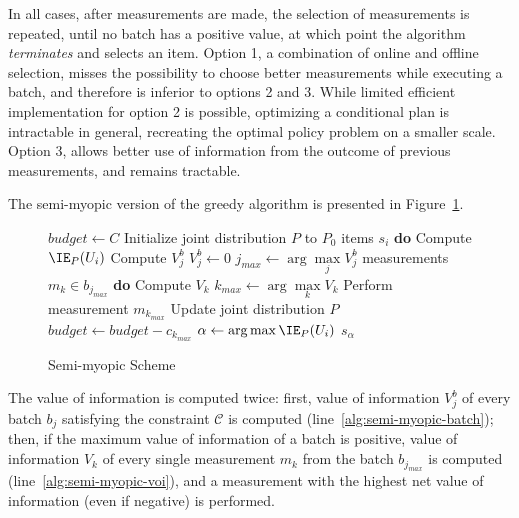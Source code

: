 In all cases, after measurements are made, the selection of measurements is repeated,
until no batch has a positive value, at which point the algorithm {\em
  terminates} and selects an item. Option 1, a combination of online
and offline selection, misses the possibility to choose better
measurements while executing a batch, and therefore is inferior to
options 2 and 3. While limited efficient implementation for option 2 is
possible, optimizing a conditional plan is intractable in general,
recreating the optimal policy problem on a smaller scale.  
Option 3, allows better use of information from
the outcome of previous measurements, and remains tractable.


The semi-myopic version of the greedy algorithm is presented in
Figure~\ref{alg:semi-myopic-scheme}. 
\begin{figure}
\begin{algorithmic}[1]
\STATE $budget \leftarrow C$
\STATE Initialize joint distribution $P$ to $P_0$ \label{alg:semi-myopic-initialize-beliefs}
\LOOP                        \label{alg:semi-myopic-main-loop-start}
   items $s_i$ {\bf do} Compute $\IE_P(U_i)$ \label{alg:semi-myopic-compute-eu}
    \label{alg:semi-myopic-select-start}\label{alg:semi-myopic-compute-batch-start}
      \STATE Compute $V_j^b$
    \ELSE
      \STATE $V_j^b \leftarrow 0$ \label{alg:semi-myopic-batch}
    \ENDIF
  \ENDFOR                         \label{alg:semi-myopic-compute-batch-end}
  \STATE $j_{max} \leftarrow \arg \max\limits_j V_j^b$
     {measurements $m_k \in b_{j_{max}}$} {\bf do} Compute $V_k$  \label{alg:semi-myopic-voi}
    \STATE $k_{max} \leftarrow \arg \max\limits_k V_k$
    \STATE Perform measurement $m_{k_{max}}$ \label{alg:semi-myopic-measure}
    \STATE Update joint distribution $P$ \label{alg:semi-myopic-update-beliefs}
    \STATE $budget \leftarrow budget-c_{k_{max}}$  \label{alg:semi-myopic-select-end}
  \ENDIF
   \label{alg:semi-myopic-break}
\ENDLOOP                \label{alg:semi-myopic-main-loop-end}
\STATE $\alpha \leftarrow \arg \max \IE_P(U_i)$ \label{alg:semi-myopic-return-alpha}
\RETURN $s_\alpha$
\end{algorithmic}
\caption{Semi-myopic Scheme}
\label{alg:semi-myopic-scheme}
\end{figure}
The value of information is computed twice: first, value of
information $V_j^b$ of every batch $b_j$ satisfying the constraint
$\mathcal{C}$ is computed (line~\ref{alg:semi-myopic-batch});
then, if the maximum value of information of a batch is positive,
value of information $V_k$ of every single measurement $m_k$ from
the batch $b_{j_{max}}$ is computed
(line~\ref{alg:semi-myopic-voi}), and a measurement with the highest
net value of information (even if negative) is performed.

